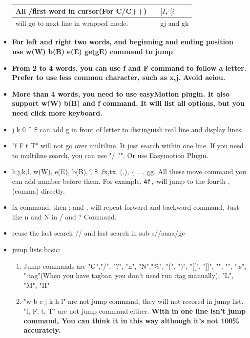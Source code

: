 \documentclass[a4paper,12pt,twoside]{book}
\begin{document}
\begin{itemize}
\begin{center}
\begin{tabular}{p{}|p{}|p{}}
		\hline 
		All /first word in cursor(For C/C++) &  & $[I$, $[i$  \\ 

		\hline 
		will go to next line in wrapped mode. & &  gj and gk \\

		\hline 
\end{tabular}
\end{center} 
		\item \textbf{For left and right two words, and beginning and ending position use w(W) b(B) e(E) ge(gE) command to jump}
						
		\item \textbf{From 2 to 4 words, you can use f and F command to follow a letter. Prefer to use less common character, such as x,j. Avoid aeiou.}

		\item \textbf{More than 4 words, you need to use easyMotion plugin. It also support w(W) b(B) and f command. It will list all options, but you need click more keyboard.}

		\item j k 0 \^{} \$ can add g in front of letter to distinguish real line and display lines.

		\item "f F t T" will not go over multiline. It just search within one line. If you need to multiline search, you can use "/ ?". Or use Easymotion Plugin.

		\item h,j,k,l, w(W), e(E), b(B), \^ , \$ ,fx,tx, (,), \{ ..., gg. All these move command you can add number before them. For example, \verb=4f,= will jump to the fourth ,(comma) directly.    

		\item fx command, then ; and , will repeat forward and backward command, Just like n and N in / and ? Command.

		\item reuse the last search // and last search in sub s//aaaa/gc				

		\item jump lists basic:
\begin{enumerate}
		\item Jump commands are "G","/", "?", "n", "N","\%", "(", ")", "[[", "]]", "{", "}", ":s", ":tag"(When you have tagbar, you don't need run :tag manually), "L", "M", "H"

		\item "w b e j k h l" are not jump command, they will not recored in jump list. "f, F, t, T" are not jump command either.  \textbf{With in one line isn't jump command, You can think it in this way although it's not 100\% accurately.}


\end{enumerate}
\end{itemize}
\end{document}
